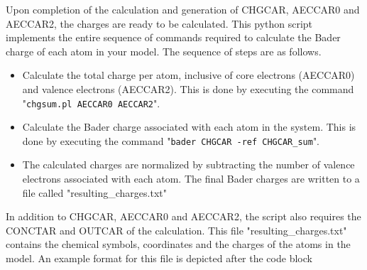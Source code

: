 \documentclass[11pt]{article}
\begin{document}
Upon completion of the calculation and generation of CHGCAR, AECCAR0 and AECCAR2, the charges are ready to be calculated. This python script implements the entire sequence of commands required to calculate the Bader charge of each atom in your model. The sequence of steps are as follows.
\begin{itemize}
\item Calculate the total charge per atom, inclusive of core electrons (AECCAR0) and valence electrons (AECCAR2). This is done by executing the command "\texttt{chgsum.pl AECCAR0 AECCAR2}".
\item Calculate the Bader charge associated with each atom in the system. This is done by executing the command "\texttt{bader CHGCAR -ref CHGCAR\_sum}".
\item The calculated charges are normalized by subtracting the number of valence electrons associated with each atom. The final Bader charges are written to a file called "resulting\_charges.txt"
\end{itemize}

In addition to CHGCAR, AECCAR0 and AECCAR2, the script also requires the CONCTAR and OUTCAR of the calculation. This file "resulting\_charges.txt" contains the chemical symbols, coordinates and the charges of the atoms in the model. An example format for this file is depicted after the code block
\end{document}
